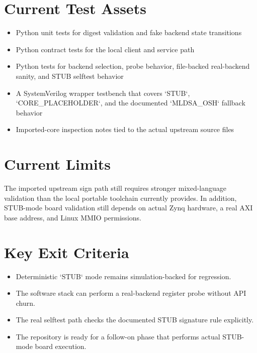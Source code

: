 \section{Current Test Assets}
\begin{itemize}[leftmargin=*]
  \item Python unit tests for digest validation and fake backend state transitions
  \item Python contract tests for the local client and service path
  \item Python tests for backend selection, probe behavior, file-backed real-backend sanity, and STUB selftest behavior
  \item A SystemVerilog wrapper testbench that covers `STUB`, `CORE\_PLACEHOLDER`, and the documented `MLDSA\_OSH` fallback behavior
  \item Imported-core inspection notes tied to the actual upstream source files
\end{itemize}

\section{Current Limits}
The imported upstream sign path still requires stronger mixed-language validation than the local portable toolchain currently provides. In addition, STUB-mode board validation still depends on actual Zynq hardware, a real AXI base address, and Linux MMIO permissions.

\section{Key Exit Criteria}
\begin{itemize}[leftmargin=*]
  \item Deterministic `STUB` mode remains simulation-backed for regression.
  \item The software stack can perform a real-backend register probe without API churn.
  \item The real selftest path checks the documented STUB signature rule explicitly.
  \item The repository is ready for a follow-on phase that performs actual STUB-mode board execution.
\end{itemize}